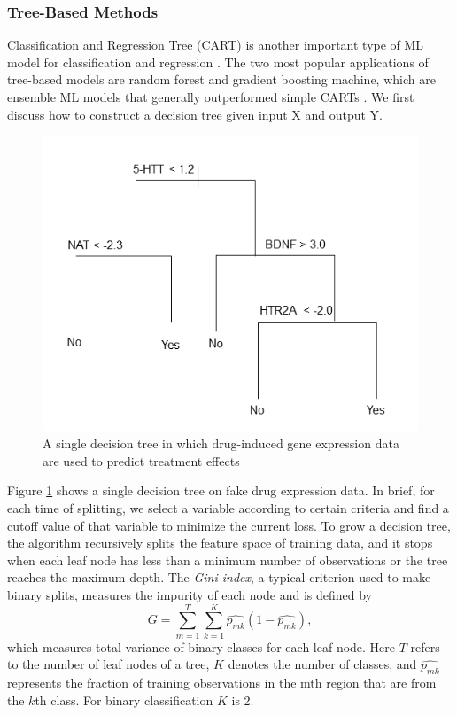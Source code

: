     \subsubsection{Tree-Based Methods}
      Classification and Regression Tree (CART) is another important type of ML model for classification and regression \cite{breiman1984classification,breiman2001random}. The two most popular applications of tree-based models are random forest and gradient boosting machine, which are ensemble ML models that generally outperformed simple CARTs \cite{breiman2001random,friedman2001greedy}. We first discuss how to construct a decision tree given input X and output Y.
      \begin{figure}[h]
        \centering
        \includegraphics[width=12cm]{figures/decision_tree.png}
        \caption{A single decision tree in which drug-induced gene expression data are used to predict treatment effects}
        \label{fig:intr_tree}
      \end{figure}
      
      Figure \ref{fig:intr_tree} shows a single decision tree on fake drug expression data. In brief, for each time of splitting, we select a variable according to certain criteria and find a cutoff value of that variable to minimize the current loss. To grow a decision tree, the algorithm recursively splits the feature space of training data, and it stops when each leaf node has less than a minimum number of observations or the tree reaches the maximum depth. The \textit{Gini index}, a typical criterion used to make binary splits, measures the impurity of each node and is defined by \cite{james2013introduction}
      \begin{equation}
        G = \sum_{m=1}^T \sum_{k=1}^K  \hat{p_{mk}} (1 - \hat{p_{mk}}), 
      \end{equation}
      which measures total variance of binary classes for each leaf node. Here $T$ refers to the number of leaf nodes of a tree, $K$ denotes the number of classes, and $\hat{p_{mk}}$ represents the fraction of training observations in the mth region that are from the $k$th class. For binary classification $K$ is 2. 
      
